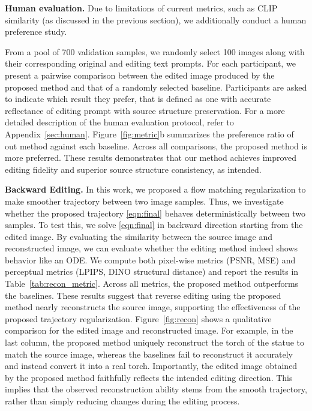 \noindent\textbf{Human evaluation.}
Due to limitations of current metrics, such as CLIP similarity (as discussed in the previous section), we additionally conduct a human preference study.

From a pool of 700 validation samples, we randomly select 100 images along with their corresponding original and editing text prompts. For each participant, we present a pairwise comparison between the edited image produced by the proposed method and that of a randomly selected baseline. 
Participants are asked to indicate which result they prefer, that is defined as one with accurate reflectance of editing prompt with source structure preservation. For a more detailed description of the human evaluation protocol, refer to Appendix~\ref{sec:human}.
Figure~\ref{fig:metric}b summarizes the preference ratio of out method against each baseline. Across all comparisons, the proposed method is more preferred. These results demonstrates that our method achieves improved editing fidelity and superior source structure consistency, as intended.

\noindent\textbf{{Backward Editing.}}
\label{subsec:recon}
In this work, we proposed a flow matching regularization to make smoother trajectory between two image samples. Thus, we investigate whether the proposed trajectory \eqref{eqn:final} behaves deterministically between two samples. To test this, we solve \eqref{eqn:final} in backward direction starting from the edited image.
By evaluating the similarity between the source image and reconstructed image, we can evaluate whether the editing method  indeed shows behavior like an ODE.
We compute both pixel-wise metrics (PSNR, MSE) and perceptual metrics (LPIPS, DINO structural distance) and report the results in Table~\ref{tab:recon_metric}. Across all metrics, the proposed method outperforms the baselines. These results suggest that reverse editing using the proposed method nearly reconstructs the source image, supporting the effectiveness of the proposed trajectory regularization.
Figure~\ref{fig:recon} shows a qualitative comparison for the edited image and reconstructed image. For example, in the last column, the proposed method uniquely reconstruct the torch of the statue to match the source image, whereas the baselines fail to reconstruct it accurately and instead convert it into a real torch. Importantly, the edited image obtained by the proposed method faithfully reflects the intended editing direction. This implies that the observed reconstruction ability stems from the smooth trajectory, rather than simply reducing changes during the editing process.

